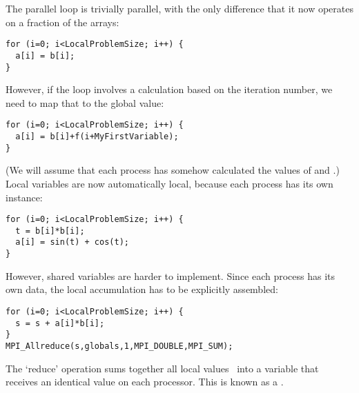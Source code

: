 The parallel loop
is trivially parallel, with the only difference that it now operates
on a fraction of the arrays:
\begin{verbatim}
for (i=0; i<LocalProblemSize; i++) {
  a[i] = b[i];
}
\end{verbatim}

However, if the loop involves a calculation based on the iteration
number, we need to map that to the global value:
\begin{verbatim}
for (i=0; i<LocalProblemSize; i++) {
  a[i] = b[i]+f(i+MyFirstVariable);
}
\end{verbatim}
(We will assume that each process has somehow calculated the values of
 and .)
Local variables are now automatically local, because each process has
its own instance:
\begin{verbatim}
for (i=0; i<LocalProblemSize; i++) {
  t = b[i]*b[i];
  a[i] = sin(t) + cos(t);
}
\end{verbatim}
However, shared variables are harder to implement. Since each process
has its own data, the local accumulation has to be explicitly assembled:
\begin{verbatim}
for (i=0; i<LocalProblemSize; i++) {
  s = s + a[i]*b[i];
}
MPI_Allreduce(s,globals,1,MPI_DOUBLE,MPI_SUM);
\end{verbatim}
The `reduce' operation sums together all local values~ into a
variable  that receives an identical value on each
processor. This is known as a .

